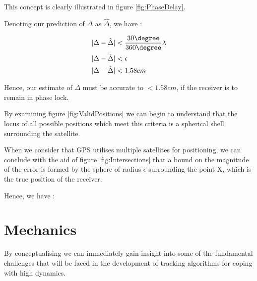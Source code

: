 This concept is clearly illustrated in figure \ref{fig:PhaseDelay}. 

Denoting our prediction of $\Delta$ as $\hat{\Delta}$, we have :

\begin{align}
|\Delta-\hat{\Delta}|& < \frac{30\degree}{360\degree} \lambda\\
|\Delta-\hat{\Delta}|&<\epsilon\\
|\Delta-\hat{\Delta}|&<1.58cm\\
\label{eq:RangeErrorBound}
\end{align}

Hence, our estimate of $\Delta$ must be accurate to $< 1.58cm$, if the receiver is to remain in phase lock.

By examining figure \ref{fig:ValidPositions} we can begin to understand that the locus of all possible positions which meet this criteria is a spherical shell surrounding the satellite. 

When we consider that GPS utilises multiple satellites for positioning, we can conclude with the aid of figure \ref{fig:Intersections} that a bound on the magnitude of the error is formed by the sphere of radius $\epsilon$ surrounding the point X, which is the true position of the receiver. 

Hence, we have :

\begin{comment}
\begin{align}
| X(t)-\hat{X}(t) | & < \frac{30\degree}{360\degree} \lambda \\
| X(t)-\hat{X}(t) | &<\Delta\\
| X(t)-\hat{X}(t) | & < 1.58cm
\label{eq:PositionErrorBound}
\end{align}
\end{comment}

\section{Mechanics}

By conceptualising we can immediately gain insight into some of the fundamental challenges that will be faced in the development of tracking algorithms for coping with high dynamics.








